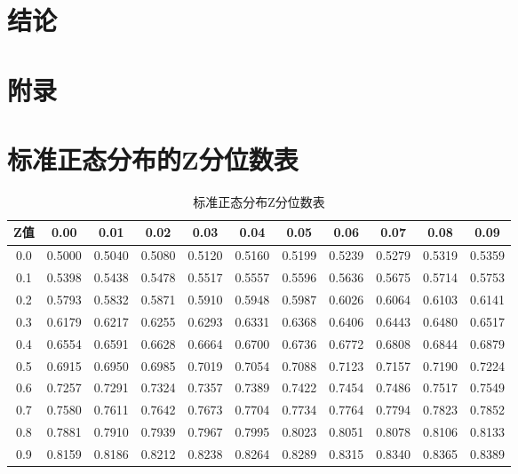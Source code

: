 \documentclass[12pt]{article}
\begin{document}
\newpage
\section{结论}




\appendix
\section*{\centering \Huge 附录}

\section{标准正态分布的Z分位数表}
\begin{table}[H]
    \centering
        \caption{\small 标准正态分布Z分位数表}
        \label{tab:z_table_detailed}
        \begin{tabular}{|c|c|c|c|c|c|c|c|c|c|c|}
            \hline
            Z值 & 0.00 & 0.01 & 0.02 & 0.03 & 0.04 & 0.05 & 0.06 & 0.07 & 0.08 & 0.09 \\ \hline
            0.0 & 0.5000 & 0.5040 & 0.5080 & 0.5120 & 0.5160 & 0.5199 & 0.5239 & 0.5279 & 0.5319 & 0.5359 \\ \hline
            0.1 & 0.5398 & 0.5438 & 0.5478 & 0.5517 & 0.5557 & 0.5596 & 0.5636 & 0.5675 & 0.5714 & 0.5753 \\ \hline
            0.2 & 0.5793 & 0.5832 & 0.5871 & 0.5910 & 0.5948 & 0.5987 & 0.6026 & 0.6064 & 0.6103 & 0.6141 \\ \hline
            0.3 & 0.6179 & 0.6217 & 0.6255 & 0.6293 & 0.6331 & 0.6368 & 0.6406 & 0.6443 & 0.6480 & 0.6517 \\ \hline
            0.4 & 0.6554 & 0.6591 & 0.6628 & 0.6664 & 0.6700 & 0.6736 & 0.6772 & 0.6808 & 0.6844 & 0.6879 \\ \hline
            0.5 & 0.6915 & 0.6950 & 0.6985 & 0.7019 & 0.7054 & 0.7088 & 0.7123 & 0.7157 & 0.7190 & 0.7224 \\ \hline
            0.6 & 0.7257 & 0.7291 & 0.7324 & 0.7357 & 0.7389 & 0.7422 & 0.7454 & 0.7486 & 0.7517 & 0.7549 \\ \hline
            0.7 & 0.7580 & 0.7611 & 0.7642 & 0.7673 & 0.7704 & 0.7734 & 0.7764 & 0.7794 & 0.7823 & 0.7852 \\ \hline
            0.8 & 0.7881 & 0.7910 & 0.7939 & 0.7967 & 0.7995 & 0.8023 & 0.8051 & 0.8078 & 0.8106 & 0.8133 \\ \hline
            0.9 & 0.8159 & 0.8186 & 0.8212 & 0.8238 & 0.8264 & 0.8289 & 0.8315 & 0.8340 & 0.8365 & 0.8389 \\ \hline

\end{tabular}
\end{table}
\end{document}

